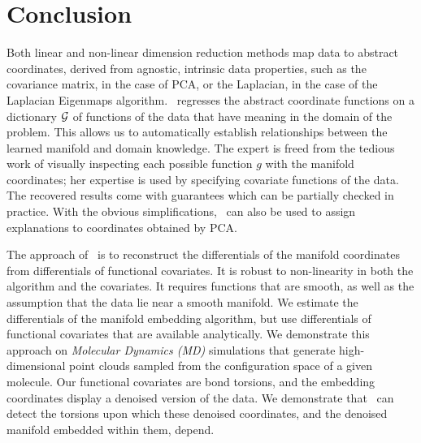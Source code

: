 \section{Conclusion}
\label{sec:conc}
Both linear and non-linear dimension reduction methods map data to abstract coordinates, derived from agnostic, intrinsic data properties, such as the covariance matrix, in the case of PCA, or the Laplacian, in the case of the Laplacian Eigenmaps algorithm. \ouralg~regresses the abstract coordinate functions on a dictionary ${\cal G}$ of functions of the data that have meaning in the domain of the problem. This allows us to  automatically
establish relationships between the learned manifold and domain knowledge. The expert is freed from the tedious work of visually inspecting each possible function $g$ with the manifold coordinates; her expertise is used by specifying covariate functions of the data. The recovered results come with guarantees which can be partially checked in practice. With the obvious simplifications, \ouralg~can also be used to assign explanations to coordinates obtained by PCA. 

The approach of \ouralg~is to reconstruct the
differentials of the manifold coordinates from
differentials of functional covariates. It is robust to
non-linearity in both the algorithm and the covariates. It
requires functions that are smooth, as well as the assumption that the
data lie near a smooth manifold. We estimate the differentials of the
manifold embedding algorithm, but use differentials of functional
covariates that are available analytically. We demonstrate this
approach on {\em Molecular Dynamics (MD)} simulations that generate
high-dimensional point clouds sampled from the configuration space of
a given molecule. Our functional covariates are bond torsions, and the
embedding coordinates display a denoised version of the data. We demonstrate that \ouralg~can detect the torsions upon which these denoised coordinates, and the
denoised manifold embedded within them, depend.

